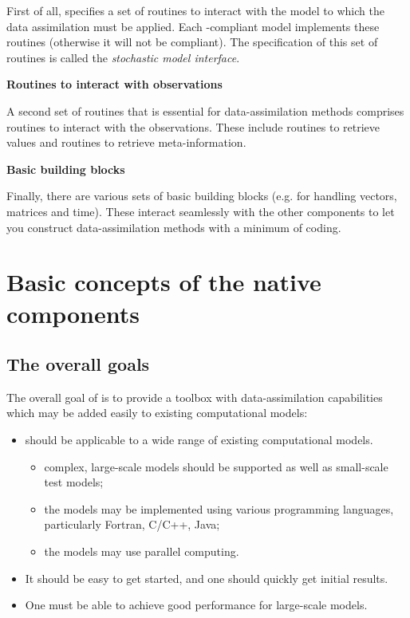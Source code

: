 First of all, \oda specifies a set of routines to interact with the model to which the data assimilation must be applied. Each \oda-compliant model implements these routines (otherwise it will not be \oda compliant). The specification of this set of routines is called the \emph{stochastic model interface}.

\textbf{Routines to interact with observations}

A second set of routines that is essential for data-assimilation methods comprises routines to interact with the observations. These include routines to retrieve values and routines to retrieve meta-information.

\textbf{Basic building blocks}

Finally, there are various sets of basic building blocks (e.g. for handling vectors, matrices and time). These interact seamlessly with the other \oda components to let you construct data-assimilation methods with a minimum of coding.

\section{Basic concepts of the \oda native components}\label{sec:components}

\subsection{The overall goals}

The overall goal of \oda is to provide a toolbox with data-assimilation capabilities which may be added easily to existing computational models:

\begin{itemize}
\item \oda should be applicable to a wide range of existing computational models.
\begin{itemize}
\item complex, large-scale models should be supported as well as small-scale test models;
\item the models may be implemented using various programming languages, particularly Fortran, C/C++, Java;
\item the models may use parallel computing.
\end{itemize}
\item It should be easy to get started, and one should quickly get initial results.
\item One must be able to achieve good performance for large-scale models.
\end{itemize}

